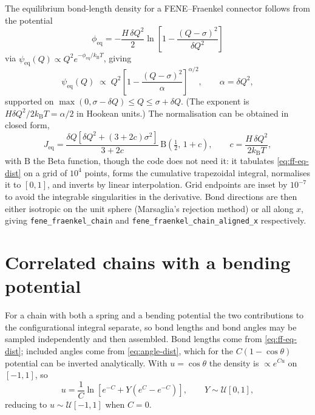 \documentclass[11pt,a4paper]{report}
\newcommand{\kB}{k_\mathrm{B}}
\newcommand{\code}[1]{\texttt{\seqsplitcode{#1}}}
\newcommand{\seqsplitcode}[1]{#1}
\begin{document}
The equilibrium bond-length density for a FENE--Fraenkel connector follows from
the potential
\begin{equation}
  \phi_{\mathrm{eq}} = -\frac{H\,\delta Q^{2}}{2}
    \ln\!\left[1-\frac{(Q-\sigma)^{2}}{\delta Q^{2}}\right]
\end{equation}
via $\psi_{\mathrm{eq}}(Q) \propto Q^{2}e^{-\phi_{\mathrm{eq}}/\kB T}$, giving
\begin{equation}
  \psi_{\mathrm{eq}}(Q) \;\propto\; Q^{2}
    \left[1-\frac{(Q-\sigma)^{2}}{\alpha}\right]^{\alpha/2},
  \qquad \alpha = \delta Q^{2},
  \label{eq:ff-eq-dist}
\end{equation}
supported on $\max(0,\sigma-\delta Q) \le Q \le \sigma+\delta Q$. (The exponent is
$H\delta Q^{2}/2\kB T = \alpha/2$ in Hookean units.) The normalisation can be
obtained in closed form,
\begin{equation}
  J_{\mathrm{eq}} = \frac{\delta Q\left[\delta Q^{2}+(3+2c)\sigma^{2}\right]}{3+2c}\,
                    \mathrm{B}\!\left(\tfrac12,\,1+c\right),
  \qquad c = \frac{H\,\delta Q^{2}}{2\kB T},
\end{equation}
with $\mathrm{B}$ the Beta function, though the code does not need it: it
tabulates \eqref{eq:ff-eq-dist} on a grid of $10^{4}$ points, forms the cumulative
trapezoidal integral, normalises it to $[0,1]$, and inverts by linear
interpolation. Grid endpoints are inset by $10^{-7}$ to avoid the integrable
singularities in the derivative. Bond directions are then either isotropic on the
unit sphere (Marsaglia's rejection method) or all along $x$, giving
\code{fene\_fraenkel\_chain} and \code{fene\_fraenkel\_chain\_aligned\_x}
respectively.

\section{Correlated chains with a bending potential}
\label{sec:mc-chain}

For a chain with both a spring and a bending potential the two contributions to
the configurational integral separate, so bond lengths and bond angles may be
sampled independently and then assembled. Bond lengths come from
\eqref{eq:ff-eq-dist}; included angles come from \eqref{eq:angle-dist}, which for
the $C(1-\cos\theta)$ potential can be inverted analytically. With
$u = \cos\theta$ the density is $\propto e^{Cu}$ on $[-1,1]$, so
\begin{equation}
  u = \frac{1}{C}\ln\!\left[e^{-C} + Y\left(e^{C}-e^{-C}\right)\right],
  \qquad Y\sim\mathcal{U}[0,1],
  \label{eq:angle-sample}
\end{equation}
reducing to $u\sim\mathcal{U}[-1,1]$ when $C=0$.
\end{document}

